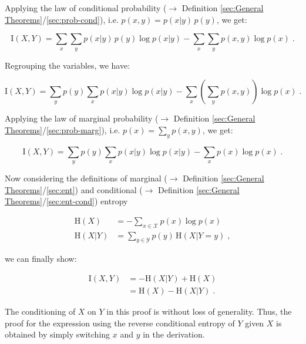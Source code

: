 \documentclass[a4paper,12pt,twoside]{book}
\begin{document}
Applying the law of conditional probability ($\rightarrow$ Definition \ref{sec:General Theorems}/\ref{sec:prob-cond}), i.e. $p(x,y) = p(x \vert y) \, p(y)$, we get:

\begin{equation} \label{eq:dmi-mce-MI-s2}
\mathrm{I}(X,Y) = \sum_x \sum_y p(x|y) \, p(y) \log p(x|y) - \sum_x \sum_y p(x,y) \log p(x) \; .
\end{equation}

Regrouping the variables, we have:

\begin{equation} \label{eq:dmi-mce-MI-s3}
\mathrm{I}(X,Y) = \sum_y p(y) \sum_x p(x|y) \log p(x|y) - \sum_x \left( \sum_y p(x,y) \right) \log p(x) \; .
\end{equation}

Applying the law of marginal probability ($\rightarrow$ Definition \ref{sec:General Theorems}/\ref{sec:prob-marg}), i.e. $p(x) = \sum_y p(x,y)$, we get:

\begin{equation} \label{eq:dmi-mce-MI-s4}
\mathrm{I}(X,Y) = \sum_y p(y) \sum_x p(x|y) \log p(x|y) - \sum_x p(x) \log p(x) \; .
\end{equation}

Now considering the definitions of marginal ($\rightarrow$ Definition \ref{sec:General Theorems}/\ref{sec:ent}) and conditional ($\rightarrow$ Definition \ref{sec:General Theorems}/\ref{sec:ent-cond}) entropy

\begin{equation} \label{eq:dmi-mce-ME-CE}
\begin{split}
\mathrm{H}(X) &= - \sum_{x \in \mathcal{X}} p(x) \log p(x) \\
\mathrm{H}(X|Y) &= \sum_{y \in \mathcal{Y}} p(y) \, \mathrm{H}(X|Y=y) \; ,
\end{split}
\end{equation}

we can finally show:

\begin{equation} \label{eq:dmi-mce-MI-qed}
\begin{split}
\mathrm{I}(X,Y) &= - \mathrm{H}(X|Y) + \mathrm{H}(X) \\
&= \mathrm{H}(X) - \mathrm{H}(X|Y) \; .
\end{split}
\end{equation}

The conditioning of $X$ on $Y$ in this proof is without loss of generality. Thus, the proof for the expression using the reverse conditional entropy of $Y$ given $X$ is obtained by simply switching $x$ and $y$ in the derivation.
\end{document}
